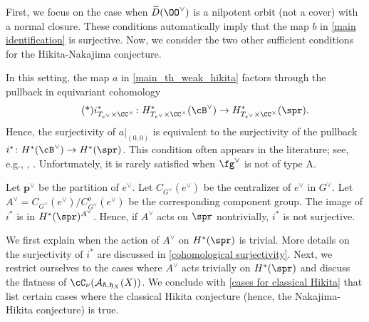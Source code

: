 \documentclass[12pt]{amsart}
\begin{document}
First, we focus on the case when $\widetilde{D}(\OO^\vee)$ is a nilpotent orbit (not a cover) with a normal closure. These conditions automatically imply that the map $b$ in \cref{main identification} is surjective. Now, we consider the two other sufficient conditions for the Hikita-Nakajima conjecture.%

In this setting, the map $a$ in \cref{main_th_weak_hikita} factors through the pullback in equivariant cohomology
\begin{equation*} \label{equivariant surjectivity} \tag{*}
    i^*_{T_{e^\vee}\times \CC^\times}\colon H^*_{T_{e^\vee}\times \CC^\times}(\cB^\vee)\rightarrow H^*_{T_{e^\vee}\times \CC^\times}(\spr).
\end{equation*}
Hence, the surjectivity of $a|_{(0,0)}$ is equivalent to the surjectivity of the pullback $i^{*}\colon H^*(\cB^\vee)\rightarrow H^*(\spr)$. This condition often appears in the literature; see, e.g., \cite[Theorem 1.2]{Kumar2012}, \cite{Carrell_2017}. Unfortunately, it is rarely satisfied when $\fg^\vee$ is not of type A. 

Let $\mathbf{p}^\vee$ be the partition of $e^\vee$. Let $C_{G^\vee}(e^\vee)$ be the centralizer of $e^\vee$ in $G^\vee$. Let $A^\vee = C_{G^\vee}(e^\vee)/C^{o}_{G^\vee}(e^\vee)$ be the corresponding component group. The image of $i^*$ is in $H^*(\spr)^{A^\vee}$. Hence, if $A^\vee$ acts on $\spr$ nontrivially, $i^*$ is not surjective.

We first explain when the action of $A^\vee$ on $H^*(\spr)$ is trivial. More details on the surjectivity of $i^*$ are discussed in \cref{cohomological surjectivity}. Next, we restrict ourselves to the cases where $A^\vee$ acts trivially on $H^*(\spr)$ and discuss the flatness of $\cC_\nu(\mathcal{A}_{\hbar,\mathfrak{h}_X}(X))$. We conclude with \cref{cases for classical Hikita} that list certain cases where the classical Hikita conjecture (hence, the Nakajima-Hikita conjecture) is true.
\end{document}
